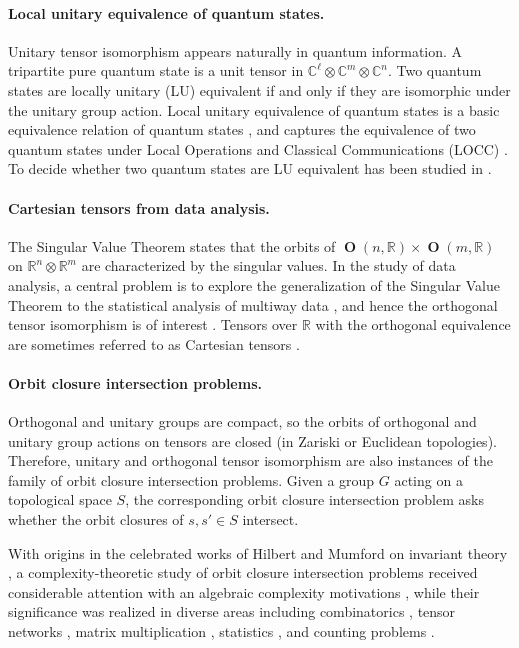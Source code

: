 \documentclass[11pt]{article}
\numberwithin{equation}{section}
\theoremstyle{remark}
\DeclareMathOperator{\Orth}{\textbf{O}}
\newcommand{\C}{\mathbb{C}}
\newcommand{\RR}{\mathbb{R}}
\begin{document}
\paragraph{Local unitary equivalence of quantum states.} Unitary tensor isomorphism appears naturally in quantum information. A tripartite pure quantum state is a unit tensor in $\C^\ell\otimes\C^m\otimes\C^n$. Two quantum states are locally unitary (LU) equivalent if and only if they are isomorphic under the unitary group action. Local unitary equivalence of quantum states is a basic equivalence relation of quantum states \cite{WGE16}, and captures the equivalence of two quantum states under Local Operations and Classical Communications (LOCC) \cite{dur2000three}. To decide whether two quantum states are LU equivalent has been studied in \cite{kraus2010local,LLLQ12}.

\paragraph{Cartesian tensors from data analysis.} The Singular Value Theorem states that the orbits of $\Orth(n, \RR)\times\Orth(m, \RR)$ on $\RR^n\otimes \RR^m$ are characterized by the singular values. In the study of data analysis, a central problem is to explore the generalization of the Singular Value Theorem to the statistical analysis of multiway data \cite{DL08}, and hence the orthogonal tensor isomorphism is of interest \cite{de2000multilinear,DL08,HU17,Sei18}. Tensors over $\RR$ with the orthogonal equivalence are sometimes referred to as Cartesian tensors \cite{CartesianTensor}.

\paragraph{Orbit closure intersection problems.} Orthogonal and unitary groups are compact, so the orbits of orthogonal and unitary group actions on tensors are closed (in Zariski or Euclidean topologies). Therefore, unitary and orthogonal tensor isomorphism are also instances of the family of orbit closure intersection problems. Given a group $G$ acting on a topological space $S$, the corresponding orbit closure intersection problem asks whether the orbit closures of $s, s'\in S$ intersect. 

With origins in the celebrated works of Hilbert and Mumford on invariant theory \cite{Hilbert,mumford1994geometric}, a complexity-theoretic study of orbit closure intersection problems received considerable attention with an algebraic complexity motivations \cite{HW15,GCT5}, while their significance was realized in diverse areas including combinatorics \cite{GGOW20,IQS18}, tensor networks \cite{acuaviva2023minimal}, matrix multiplication \cite{BI13}, statistics \cite{derksen2021maximum}, and counting problems \cite{cai2026vanishing}.
\end{document}
